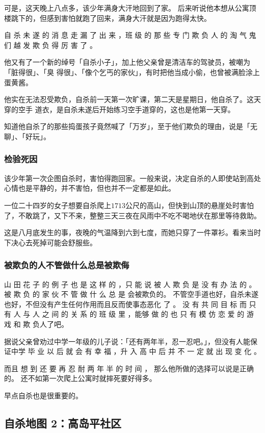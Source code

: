 \documentclass[UTF8]{ctexart}
\begin{document}
可是，这天晚上八点多，该少年满身大汗地回到了家。
后来听说他本想从公寓顶楼跳下的，但感到害怕就跑了回来，满身大汗就是因为跑得太快。

自 杀 未 遂 的 消 息 走 漏 了 出 来 ，班 级 的 那 些 专 门 欺 负 人 的 淘 气 鬼 们 越 发 欺 负 得 厉 害 了 。

他又有了一个新的绰号「自杀小子」，加上他父亲曾是清洁车的驾驶员，被嘲为「脏得很」、「臭 得很」、「像个乞丐的家伙」，有时把他当成小偷，也曾被满脸涂上蛋黄酱。

他实在无法忍受欺负，自杀前一天第一次旷课，第二天是星期日，他自杀了。这天穿的空手 道衣，是自杀未遂后开始练习空手道穿的，这也是他第一天穿。

知道他自杀了的那些捣蛋孩子竟然喊了「万岁」，至于他们欺负的理由，说是「无聊」、「好玩」。


\subsubsection*{检验死因}

该少年第一次企图自杀时，害怕得跑回家。一般来说，决定自杀的人即使站到高处心情也是平静的，并不害怕，但也并不一定都是如此。

一位二十四岁的女子想要自杀爬上$1713$公尺的高山，但快到山顶的悬崖处时害怕了，不敢跳了，又下不来，整整三天三夜在风雨中不吃不喝地伏在那里等待救助。

这是八月底发生的事，夜晚的气温降到六到七度，而她只穿了一件罩衫。看来当时下决心去死掉可能会舒服些。

\subsubsection*{被欺负的人不管做什么总是被欺侮}

 山 田 花 子 的 例 子 也 是 这 样 的 ，只 能 说 被 人 欺 负 是 没 有 办 法 的 。
被 欺 负 的 家 伙 不 管 做 什 么 总 是 会被欺负的。
不管空手道也好，自杀未遂也好，不但没有产生任何作用而且反而使事态恶化 了 。
没 有 共 同 目 标 而 只 有 人 与 人 之 间 的 关 系 的 班 级 里 ，能够 做 的 也 只 有 模 仿 恋 爱 的 游 戏 和 欺 负人了吧。

据说父亲曾劝过中学一年级的儿子说：「还有两年半，忍一忍吧。」，但没有人能保证中学 毕 业 以 后 就 会 有 幸 福 ，升 入 高 中 后 并 不 一 定 就 出 现 变 化 。

而且 想 到 还 要 再 忍 耐 两 年 半 的 时 间 ， 那么他所做的选择可以说是正确的。
还不如第一次爬上公寓时就摔死要好得多。 

早点自杀也是很重要的。

\subsection{自杀地图 2：高岛平社区}
\end{document}
